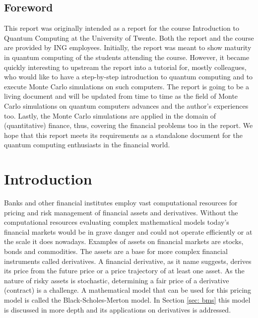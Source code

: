 \documentclass[../main.tex]{subfiles}
\begin{document}
\subsection*{Foreword}
This report was originally intended as a report for the course Introduction to Quantum Computing at the University of Twente. Both the report and the course are provided by ING employees. Initially, the report was meant to show maturity in quantum computing of the students attending the course. However, it became quickly interesting to upstream the report into a tutorial for, mostly colleagues, who would like to have a step-by-step introduction to quantum computing and to execute Monte Carlo simulations on such computers. The report is going to be a living document and will be updated from time to time as the field of Monte Carlo simulations on quantum computers advances and the author's experiences too. Lastly, the Monte Carlo simulations are applied in the domain of (quantitative) finance, thus, covering the financial problems too in the report. We hope that this report meets its requirements as a standalone document for the quantum computing enthusiasts in the financial world.

\section{Introduction}\label{sec: introduction}

Banks and other financial institutes employ vast computational resources for pricing and risk management of financial assets and derivatives. Without the computational resources evaluating complex mathematical models today's financial markets would be in grave danger and could not operate efficiently or at the scale it does nowadays. Examples of assets on financial markets are stocks, bonds and commodities. The assets are a base for more complex financial instruments called derivatives. A financial derivative, as it name suggests, derives its price from the future price or a price trajectory of at least one asset. As the nature of risky assets is stochastic, determining a fair price of a derivative (contract) is a challenge. A mathematical model that can be used for this pricing model is called the Black-Scholes-Merton model. In Section \ref{sec: bms} this model is discussed in more depth and its applications on derivatives is addressed.
\end{document}

